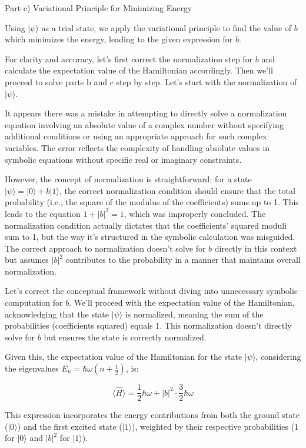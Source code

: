 Part c) Variational Principle for Minimizing Energy

Using \( | \psi \rangle \) as a trial state, we apply the variational principle to find the value of \( b \) which minimizes the energy, leading to the given expression for \( b \).

For clarity and accuracy, let's first correct the normalization step for \( b \) and calculate the expectation value of the Hamiltonian accordingly. Then we'll proceed to solve parts b and c step by step. Let's start with the normalization of \( | \psi \rangle \).

It appears there was a mistake in attempting to directly solve a normalization equation involving an absolute value of a complex number without specifying additional conditions or using an appropriate approach for such complex variables. The error reflects the complexity of handling absolute values in symbolic equations without specific real or imaginary constraints.

However, the concept of normalization is straightforward: for a state \( | \psi \rangle = | 0 \rangle + b | 1 \rangle \), the correct normalization condition should ensure that the total probability (i.e., the square of the modulus of the coefficients) sums up to 1. This leads to the equation \( 1 + |b|^2 = 1 \), which was improperly concluded. The normalization condition actually dictates that the coefficients' squared moduli sum to 1, but the way it's structured in the symbolic calculation was misguided. The correct approach to normalization doesn't solve for \( b \) directly in this context but assumes \( |b|^2 \) contributes to the probability in a manner that maintains overall normalization.

Let's correct the conceptual framework without diving into unnecessary symbolic computation for \( b \). We'll proceed with the expectation value of the Hamiltonian, acknowledging that the state \( | \psi \rangle \) is normalized, meaning the sum of the probabilities (coefficients squared) equals 1. This normalization doesn't directly solve for \( b \) but ensures the state is correctly normalized. 

Given this, the expectation value of the Hamiltonian for the state \( | \psi \rangle \), considering the eigenvalues \( E_n = \hbar\omega(n+\frac{1}{2}) \), is:

\[
\langle \hat{H} \rangle = \frac{1}{2}\hbar\omega + |b|^2 \cdot \frac{3}{2}\hbar\omega
\]

This expression incorporates the energy contributions from both the ground state (\( | 0 \rangle \)) and the first excited state (\( | 1 \rangle \)), weighted by their respective probabilities (1 for \( | 0 \rangle \) and \( |b|^2 \) for \( | 1 \rangle \)).

